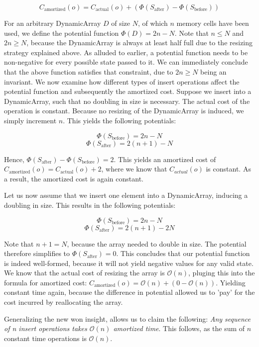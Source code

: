 \[C_{\text{amortized}}(o) = C_{\text{actual}}(o) + (\Phi(S_{\text{after}}) - \Phi(S_{\text{before}}))\]
\label{eq:amortized-cost}

For an arbitrary DynamicArray \(D\) of size \(N\), of which \(n\) memory cells have been used,  we define the potential function \(\Phi(D) = 2n - N\). Note that \(n \leq N\) and \(2n \geq N\), because the DynamicArray is always at least half full due to the resizing strategy explained above. 
As alluded to earlier, a potential function needs to be non-negative for every possible state passed to it. We can immediately conclude that the above function satisfies that constraint, due to \(2n \geq N\) being an invariant. We now examine how different types of insert operations affect the potential function and subsequently the amortized cost.
Suppose we insert into a DynamicArray, such that no doubling in size is necessary. The actual cost of the operation is constant. Because no resizing of the DynamicArray is induced, we simply increment \(n\). This yields the following potentials:

\[\Phi(S_{\text{before}}) = 2n - N\]
\[\Phi(S_{\text{after}}) = 2(n + 1) - N\]

Hence, \(\Phi(S_{\text{after}}) - \Phi(S_{\text{before}}) = 2\). This yields an amortized cost of \(C_{\text{amortized}}(o) = C_{\text{actual}}(o) + 2\), where we know that \(C_{actual}(o)\) is constant. As a result, the amortized cost is again constant.

Let us now assume that we insert one element into a DynamicArray, inducing a doubling in size. This results in the following potentials:

\[\Phi(S_{\text{before}}) = 2n - N\]
\[\Phi(S_{\text{after}}) = 2(n + 1) - 2N\]

Note that \(n + 1 = N\), because the array needed to double in size. The potential therefore simplifies to \(\Phi(S_{\text{after}}) = 0\). This concludes that our potential function is indeed well-formed, because it will not yield negative values for any valid state.
We know that the actual cost of resizing the array is \(\mathcal{O}(n)\), pluging this into the formula for amortized cost: \(C_{\text{amortized}}(o) = \mathcal{O}(n) + ( 0 - \mathcal{O}(n))\). Yielding constant time again, because the difference in potential allowed us to 'pay' for the cost incurred by reallocating the array.

Generalizing the new won insight, allows us to claim the following: \emph{Any sequence of n insert operations takes \(\mathcal{O}(n)\) amortized time}. This follows, as the sum of \(n\) constant time operations is \(\mathcal{O}(n)\). 

